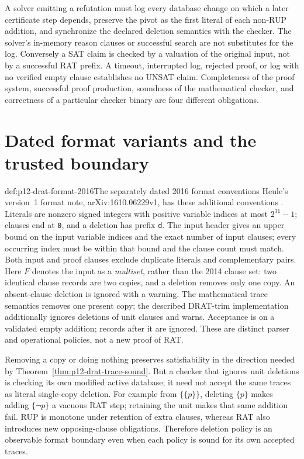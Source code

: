 A solver emitting a refutation must log every database change on which a later
certificate step depends, preserve the pivot as the first literal of each
non-RUP addition, and synchronize the declared deletion semantics with the
checker.  The solver's in-memory reason clauses or successful search are not
substitutes for the log.  Conversely a SAT claim is checked by a valuation of
the original input, not by a successful RAT prefix.  A timeout, interrupted
log, rejected proof, or log with no verified empty clause establishes no UNSAT
claim.  Completeness of the proof system, successful proof production, soundness
of the mathematical checker, and correctness of a particular checker binary
are four different obligations.

\section{Dated format variants and the trusted boundary}
\label{sec:p12-drat-format-versions}

\begin{hbdefinition}{def:p12-drat-format-2016}{The separately dated 2016 format conventions}
Heule's version~1 format note, arXiv:1610.06229v1, has these additional
conventions \cite[Syntax of Input Files; Clause Syntax Restrictions; Clause
Deletion Details]{Heule2016DRATFormatV1}.  Literals are nonzero signed
integers with positive variable indices at most \(2^{31}-1\); clauses end
at \texttt{0}, and a deletion has prefix \texttt{d}.
The input header gives an upper bound on the input variable indices and the
exact number of input clauses; every occurring index must be within that bound
and the clause count must match.  Both input and proof clauses exclude
duplicate literals and complementary pairs.  Here \(F\) denotes the input
as a \emph{multiset}, rather than the 2014 clause set:
two identical clause records are two copies, and a deletion removes only one
copy.  An absent-clause deletion is ignored with a warning.  The mathematical
trace semantics removes one present copy; the described DRAT-trim
implementation additionally ignores deletions of unit clauses and warns.
Acceptance is on a validated empty addition; records after it are ignored.
These are distinct parser and operational policies, not a new proof of RAT.

Removing a copy or doing nothing preserves satisfiability in the direction
needed by Theorem~\ref{thm:p12-drat-trace-sound}.  But a checker that ignores
unit deletions is checking its own modified active database; it need not accept
the same traces as literal single-copy deletion.  For example from
\(\{\{p\}\}\), deleting \(\{p\}\) makes adding \(\{\neg p\}\)
a vacuous RAT step; retaining the unit makes that same addition fail.
RUP is monotone under retention of extra clauses, whereas RAT also introduces
new opposing-clause obligations.  Therefore deletion policy is an observable
format boundary even when each policy is sound for its own accepted traces.
\end{hbdefinition}

